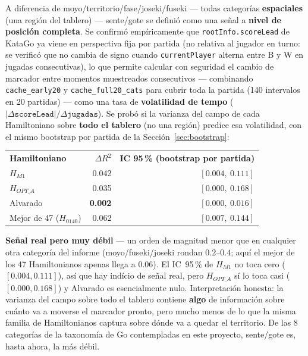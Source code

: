 \documentclass[11pt, a4paper]{article}
\newcommand{\TH}[1]{\cellcolor{cTHbg}\color{white}\textbf{#1}}
\newcommand{\bad}[1]{\color{cBad}\textbf{#1}}
\begin{document}
A diferencia de moyo/territorio/fase/joseki/fuseki --- todas
categor\'ias \textbf{espaciales} (una regi\'on del tablero) --- sente/gote
se defini\'o como una se\~nal a \textbf{nivel de posici\'on completa}.
Se confirm\'o emp\'iricamente que \texttt{rootInfo.scoreLead} de KataGo
ya viene en perspectiva fija por partida (no relativa al jugador en
turno: se verific\'o que no cambia de signo cuando \texttt{currentPlayer}
alterna entre B y W en jugadas consecutivas), lo que permite calcular
con seguridad el cambio de marcador entre momentos muestreados
consecutivos --- combinando \texttt{cache\_early20} y
\texttt{cache\_full20\_cats} para cubrir toda la partida (140 intervalos
en 20 partidas) --- como una tasa de \textbf{volatilidad de tempo}
($|\Delta\texttt{scoreLead}|/\Delta\texttt{jugadas}$). Se prob\'o si la
varianza del campo de cada Hamiltoniano sobre \textbf{todo el tablero}
(no una regi\'on) predice esa volatilidad, con el mismo bootstrap por
partida de la Secci\'on~\ref{sec:bootstrap}:

\medskip
\begin{center}
\begin{tabular}{lrr}
  \TH{Hamiltoniano} & \TH{$\Delta R^2$} & \TH{IC 95\,\% (bootstrap por partida)} \\[1pt]
  $H_{M1}$                        & 0.042 & $[0.004,\ 0.111]$ \\
  $H_{OPT\_A}$                    & 0.035 & $[0.000,\ 0.168]$ \\
  Alvarado                        & \bad{0.002} & $[0.000,\ 0.016]$ \\
  Mejor de 47 ($H_{0140}$)        & 0.062 & $[0.007,\ 0.144]$ \\
\end{tabular}
\end{center}
\medskip

\begin{tcolorbox}[quotebox]
  \textbf{Se\~nal real pero muy d\'ebil} --- un orden de magnitud menor
  que en cualquier otra categor\'ia del informe (moyo/fuseki/joseki
  rondan $0.2$--$0.4$; aqu\'i el mejor de los 47 Hamiltonianos apenas
  llega a $0.06$). El IC~95\,\% de $H_{M1}$ no toca cero
  ($[0.004,0.111]$), as\'i que hay ind\'icio de se\~nal real, pero
  $H_{OPT\_A}$ s\'i lo toca casi ($[0.000,0.168]$) y Alvarado es
  esencialmente nulo. Interpretaci\'on honesta: la varianza del campo
  sobre todo el tablero contiene \textbf{algo} de informaci\'on sobre
  cu\'anto va a moverse el marcador pronto, pero mucho menos de lo que
  la misma familia de Hamiltonianos captura sobre d\'onde va a quedar
  el territorio. De las 8 categor\'ias de la taxonom\'ia de Go
  contempladas en este proyecto, sente/gote es, hasta ahora, la m\'as
  d\'ebil.
\end{tcolorbox}
\end{document}
